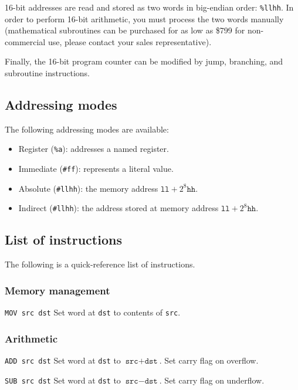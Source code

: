 \documentclass[a5paper,onecolumn,final,10pt]{memoir}
\begin{document}
16-bit addresses are read and stored as two words in big-endian order: \texttt{\%llhh}. 
In order to perform 16-bit arithmetic, you must process the two words manually 
(mathematical subroutines can be purchased for as low as \$799 for non-commercial use, please contact your sales representative). 

Finally, the 16-bit program counter can be modified by jump, branching, and subroutine instructions. 

\subsection*{Addressing modes}

The following addressing modes are available:

\begin{itemize}[nosep]
	\item Register (\texttt{\%a}): addresses a named register. 
	\item Immediate (\texttt{\#ff}): represents a literal value. 
	\item Absolute (\texttt{\#llhh}): the memory address $\texttt{ll}+2^8\texttt{hh}$. 
	\item Indirect (\texttt{\#llhh}): the address stored at memory address $\texttt{ll}+2^8\texttt{hh}$. 
\end{itemize}

\subsection*{List of instructions}

The following is a quick-reference list of instructions. 

\subsubsection*{Memory management}

\noindent\texttt{MOV src dst} \quad Set word at \texttt{dst} to contents of \texttt{src}. 

\subsubsection*{Arithmetic}

\noindent\texttt{ADD src dst} \quad Set word at \texttt{dst} to $\texttt{src}+\texttt{dst}$. Set carry flag on overflow.  

\noindent\texttt{SUB src dst} \quad Set word at \texttt{dst} to $\texttt{src}-\texttt{dst}$. Set carry flag on underflow. 
\end{document}

